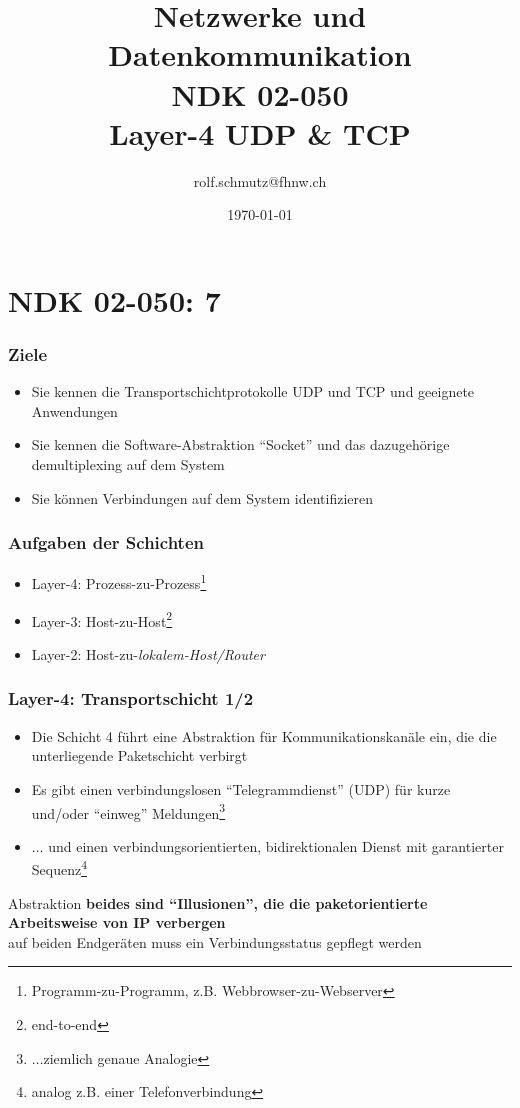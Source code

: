 \documentclass[ignorenonframetext]{beamer}
\date{\today}
\author{rolf.schmutz@fhnw.ch}
\institute{FHNW}
\title {Netzwerke und Datenkommunikation\\NDK 02-050\\Layer-4 UDP \& TCP}
\begin{document}

\section{NDK 02-050: 7}



\begin{frame}
\titlepage
\end{frame}




\begin{frame}
\frametitle{Ziele}
\begin{itemize}
	\item{Sie kennen die Transportschichtprotokolle UDP und TCP und geeignete Anwendungen}
	\item{Sie kennen die Software-Abstraktion ``Socket'' und das dazugeh\"orige demultiplexing auf dem System}
	\item{Sie k\"onnen Verbindungen auf dem System identifizieren}
\end{itemize}
\end{frame}


\begin{frame}
\frametitle{Aufgaben der Schichten}
\begin{itemize}
	\item Layer-4: Prozess-zu-Prozess\footnote{Programm-zu-Programm, z.B. Webbrowser-zu-Webserver}
	\item Layer-3: Host-zu-Host\footnote{end-to-end}
	\item Layer-2: Host-zu-\em{lokalem-Host/Router}
\end{itemize}
\end{frame}



\begin{frame}
\frametitle{Layer-4: Transportschicht 1/2}
\begin{itemize}
	\item{Die Schicht 4 f\"uhrt eine Abstraktion f\"ur Kommunikationskan\"ale ein, die die unterliegende Paketschicht verbirgt}
	\item[1]{Es gibt einen verbindungslosen ``Telegrammdienst'' (UDP) f\"ur kurze und/oder ``einweg'' Meldungen\footnote{$\ldots$ziemlich genaue Analogie}}
	\item[2]{$\ldots$ und einen verbindungsorientierten, bidirektionalen Dienst mit garantierter Sequenz\footnote{analog z.B. einer Telefonverbindung}}
\end{itemize}
	\begin{block}{Abstraktion}
\textbf{beides sind ``Illusionen'', die die paketorientierte Arbeitsweise von IP verbergen}\\
auf beiden Endger\"aten muss ein Verbindungsstatus gepflegt werden
\end{block}
\end{frame}
\end{document}

